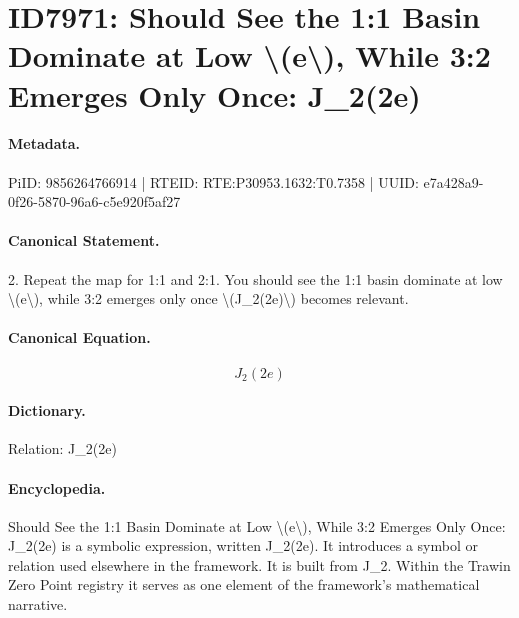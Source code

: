 \section*{ID7971: Should See the 1:1 Basin Dominate at Low \textbackslash{}(e\textbackslash{}), While 3:2 Emerges Only Once: J\_2(2e)}
\paragraph{Metadata.}
PiID: 9856264766914 | RTEID: RTE:P30953.1632:T0.7358 | UUID: e7a428a9-0f26-5870-96a6-c5e920f5af27

\paragraph{Canonical Statement.}
2. Repeat the map for 1:1 and 2:1. You should see the 1:1 basin dominate at low \textbackslash{}(e\textbackslash{}), while 3:2 emerges only once \textbackslash{}(J\_2(2e)\textbackslash{}) becomes relevant.

\paragraph{Canonical Equation.}
\[
J_2(2e)
\]

\paragraph{Dictionary.}
Relation: J\_2(2e)

\paragraph{Encyclopedia.}
Should See the 1:1 Basin Dominate at Low \textbackslash{}(e\textbackslash{}), While 3:2 Emerges Only Once: J\_2(2e) is a symbolic expression, written J\_2(2e). It introduces a symbol or relation used elsewhere in the framework. It is built from J\_2. Within the Trawin Zero Point registry it serves as one element of the framework's mathematical narrative.
